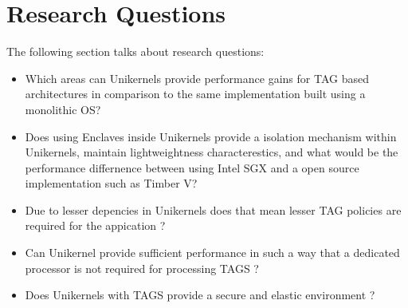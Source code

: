 
\chapter{Research Questions}  %

The following section talks about research questions: 

\begin{itemize}
    \item Which areas can Unikernels provide performance gains for TAG based architectures in comparison to the same implementation built using a monolithic OS? 
    \item Does using Enclaves inside Unikernels provide a isolation mechanism within Unikernels, maintain lightweightness characterestics, and 
    what would be the performance differnence between using Intel SGX and a open source implementation such as Timber V?
    \item Due to lesser depencies in Unikernels does that mean lesser TAG policies are required for the appication ? 
    \item Can Unikernel provide sufficient performance in such a way that a dedicated processor is not required for processing TAGS ?   
    \item Does Unikernels with TAGS provide a secure and elastic environment ? 
\end{itemize}